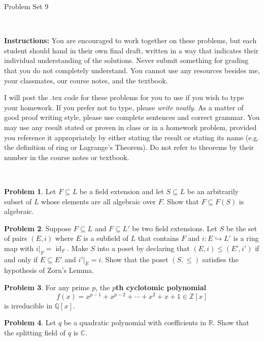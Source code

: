 \documentclass[11pt]{article}
\title{}
\date{\vspace{-0.5in}}
\DeclareMathOperator{\id}{id}
\newcommand{\C}{\mathbb{C}}
\newcommand{\Q}{\mathbb{Q}}
\newcommand{\Z}{\mathbb{Z}}
\newcommand{\R}{\mathbb{R}}
\theoremstyle{definition}
\newtheorem{problem}{Problem}
\begin{document}
\thispagestyle{fancy}
\pagestyle{fancy}

\vspace{3em}

\begin{center}
	{\LARGE Problem Set 9}
\end{center}

\

\noindent
{\bf Instructions:}
You are encouraged to work together on these problems, but each student should hand in their own final draft, written in a way that indicates their individual understanding of the solutions. Never submit something for grading that you do not completely understand. You cannot use any resources besides me, your classmates, our course notes, and the textbook.


I will post the .tex code for these problems for you to use if you wish to type your homework. If you prefer not to type, please  {\em write neatly}. As a matter of good proof writing style, please use complete sentences and correct grammar. You may use any result  stated or proven in class or in a homework problem, provided you reference it appropriately by either stating the result or stating its name (e.g. the definition of ring or Lagrange's Theorem). Do not refer to theorems by their number in the course notes or textbook.


\



\begin{problem}
	Let $F \subseteq L$ be a field extension and let $S \subseteq L$ be an arbitrarily subset of $L$ whose elements are all algebraic over $F$. Show that $F \subseteq F(S)$ is algebraic.
\end{problem}



\begin{problem}
Suppose $F \subseteq L$ and $F \subseteq L'$ be two field extensions. Let $S$ be the set of pairs $(E,i)$ where $E$ is a subfield of $L$ that contains $F$ and $i: E \hookrightarrow L'$ is a ring map with $i|_F = \id_F$. Make $S$ into a poset by declaring that $(E,i) \leq (E',i')$ if and only if $E \subseteq E'$ and $i'|_E = i$. Show that the poset $(S, \leq)$ satisfies the hypothesis of Zorn's Lemma.
\end{problem}



\begin{problem} 
For any prime $p$, the {\bf $p$th cyclotomic polynomial}
$$f(x) = x^{p-1} + x^{p-2} + \cdots + x^2 + x + 1 \in \Z[x]$$
is irreducible in $\Q[x]$.
\end{problem}



\begin{problem}
	Let $q$ be a quadratic polynomial with coefficients in $\R$. Show that the splitting field of $q$ is $\C$.
\end{problem}
\end{document}
